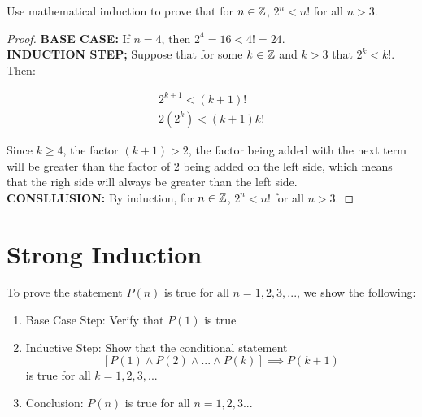 \begin{problem}
    Use mathematical induction to prove that for $n\in\mathbb{Z}$, $2^n < n!$ for all $n > 3$.

    \begin{proof}
        \textbf{BASE CASE:} If $n = 4$, then $2^4=16<4!=24$.\\

        \textbf{INDUCTION STEP;} Suppose that for some $k\in\mathbb{Z}$  and $k > 3$ that $2^k < k!$. Then:

        $$
        \begin{aligned}
            2^{k+1} < (k+1)!\\
            2(2^k) < (k+1)k!
        \end{aligned}
        $$

        Since $k\ge 4$, the factor $(k+1)>2$, the factor being added with the next term will be greater than the factor of $2$ being added on the left side, which means that the righ side will always be greater than the left side.\\

        \textbf{CONSLLUSION:} By induction, for $n\in\mathbb{Z}$, $2^n < n!$ for all $n > 3$.
    \end{proof}
\end{problem}


\section{Strong Induction}

To prove the statement $P(n)$ is true for all $n=1,2,3,...$, we show the following:
    
    \begin{enumerate}
        \item Base Case Step: Verify that $P(1)$ is true
        \item Inductive Step: Show that the conditional statement $$[P(1) \wedge P(2) \wedge... \wedge P(k)] \implies P(k+1)$$ is true for all $k = 1,2,3,...$
        \item Conclusion: $P(n)$ is true for all $n=1,2,3...$
    \end{enumerate}

